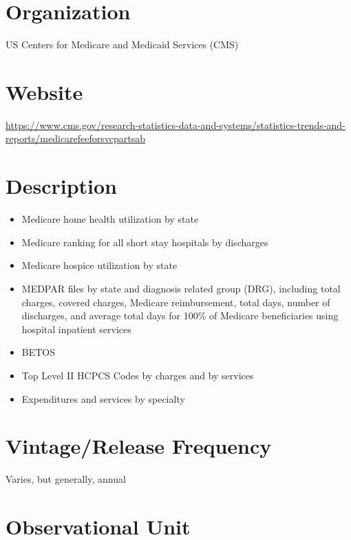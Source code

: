 \documentclass[
]{book}
\providecommand{\tightlist}{%
  \setlength{\itemsep}{0pt}\setlength{\parskip}{0pt}}
\begin{document}
\hypertarget{organization-39}{%
\section{Organization}\label{organization-39}}

US Centers for Medicare and Medicaid Services (CMS)

\hypertarget{website-39}{%
\section{Website}\label{website-39}}

\url{https://www.cms.gov/research-statistics-data-and-systems/statistics-trends-and-reports/medicarefeeforsvcpartsab}

\hypertarget{description-39}{%
\section{Description}\label{description-39}}

\begin{itemize}
\tightlist
\item
  Medicare home health utilization by state
\item
  Medicare ranking for all short stay hospitals by discharges
\item
  Medicare hospice utilization by state
\item
  MEDPAR files by state and diagnosis related group (DRG), including total charges, covered charges, Medicare reimbursement, total days, number of discharges, and average total days for 100\% of Medicare beneficiaries using hospital inpatient services
\item
  BETOS
\item
  Top Level II HCPCS Codes by charges and by services
\item
  Expenditures and services by specialty
\end{itemize}

\hypertarget{vintagerelease-frequency-39}{%
\section{Vintage/Release Frequency}\label{vintagerelease-frequency-39}}

Varies, but generally, annual

\hypertarget{observational-unit-39}{%
\section{Observational Unit}\label{observational-unit-39}}
\end{document}
